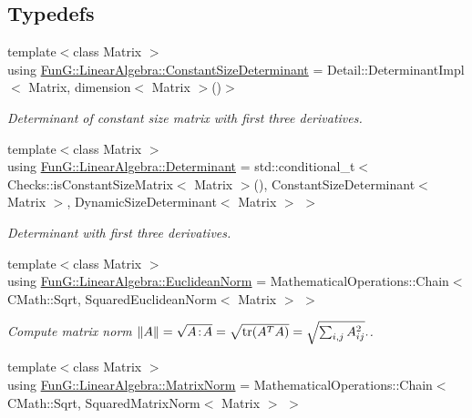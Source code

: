 \subsection*{Typedefs}
\begin{DoxyCompactItemize}
\item 
\hypertarget{group__LinearAlgebraGroup_gaae7e69f9b2f52856287fa722b6f54c04}{{\footnotesize template$<$class Matrix $>$ }\\using \hyperlink{group__LinearAlgebraGroup_gaae7e69f9b2f52856287fa722b6f54c04}{Fun\-G\-::\-Linear\-Algebra\-::\-Constant\-Size\-Determinant} = Detail\-::\-Determinant\-Impl$<$ Matrix, dimension$<$ Matrix $>$()$>$}\label{group__LinearAlgebraGroup_gaae7e69f9b2f52856287fa722b6f54c04}

\begin{DoxyCompactList}\small\item\em Determinant of constant size matrix with first three derivatives. \end{DoxyCompactList}\item 
\hypertarget{group__LinearAlgebraGroup_ga2ab0f9ef0c535fd8155856675edcc06a}{{\footnotesize template$<$class Matrix $>$ }\\using \hyperlink{group__LinearAlgebraGroup_ga2ab0f9ef0c535fd8155856675edcc06a}{Fun\-G\-::\-Linear\-Algebra\-::\-Determinant} = std\-::conditional\-\_\-t$<$ Checks\-::is\-Constant\-Size\-Matrix$<$ Matrix $>$(), Constant\-Size\-Determinant$<$ Matrix $>$, Dynamic\-Size\-Determinant$<$ Matrix $>$ $>$}\label{group__LinearAlgebraGroup_ga2ab0f9ef0c535fd8155856675edcc06a}

\begin{DoxyCompactList}\small\item\em Determinant with first three derivatives. \end{DoxyCompactList}\item 
\hypertarget{group__LinearAlgebraGroup_gad531065eea58cbd1f2e5e77c7fd5028d}{{\footnotesize template$<$class Matrix $>$ }\\using \hyperlink{group__LinearAlgebraGroup_gad531065eea58cbd1f2e5e77c7fd5028d}{Fun\-G\-::\-Linear\-Algebra\-::\-Euclidean\-Norm} = Mathematical\-Operations\-::\-Chain$<$ C\-Math\-::\-Sqrt, Squared\-Euclidean\-Norm$<$ Matrix $>$ $>$}\label{group__LinearAlgebraGroup_gad531065eea58cbd1f2e5e77c7fd5028d}

\begin{DoxyCompactList}\small\item\em Compute matrix norm $ \|A\| = \sqrt{A\negthinspace : \negthinspace A }= \sqrt{\mathrm{tr}(A^TA)} = \sqrt{\sum_{i,j} A_{ij}^2}. $. \end{DoxyCompactList}\item 
\hypertarget{group__LinearAlgebraGroup_ga0107947440eb770f66179b453c313472}{{\footnotesize template$<$class Matrix $>$ }\\using \hyperlink{group__LinearAlgebraGroup_ga0107947440eb770f66179b453c313472}{Fun\-G\-::\-Linear\-Algebra\-::\-Matrix\-Norm} = Mathematical\-Operations\-::\-Chain$<$ C\-Math\-::\-Sqrt, Squared\-Matrix\-Norm$<$ Matrix $>$ $>$}\label{group__LinearAlgebraGroup_ga0107947440eb770f66179b453c313472}


\end{DoxyCompactItemize}
